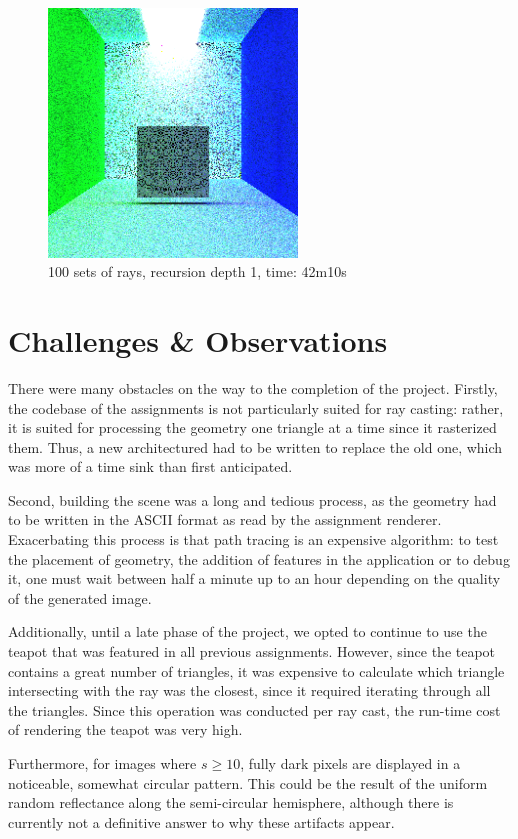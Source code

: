 \documentclass[12pt,journal]{IEEEtran}
\begin{document}
\begin{figure}[!t]

\centering
\includegraphics[width=2.6in]{100s_16d_42m10s}
\caption{100 sets of rays, recursion depth 1, time: 42m10s}
\label{1100s_16d_42m10s}

\end{figure}

\section{Challenges \& Observations}
There were many obstacles on the way to the completion of the project. Firstly, the codebase of the assignments is not particularly suited for ray casting: rather, it is suited for processing the geometry one triangle at a time since it rasterized them. Thus, a new architectured had to be written to replace the old one, which was more of a time sink than first anticipated. 
\par
Second, building the scene was a long and tedious process, as the geometry had to be written in the ASCII format as read by the assignment renderer. Exacerbating this process is that path tracing is an expensive algorithm: to test the placement of geometry, the addition of features in the application or to debug it, one must wait between half a minute up to an hour depending on the quality of the generated image.
\par
Additionally, until a late phase of the project, we opted to continue to use the teapot that was featured in all previous assignments. However, since the teapot contains a great number of triangles, it was  expensive to calculate which triangle intersecting with the ray was the closest, since it required iterating through all the triangles. Since this operation was conducted per ray cast, the run-time cost of rendering the teapot was very high.
\par
Furthermore, for images where $s \ge 10$, fully dark pixels are displayed in a noticeable, somewhat circular pattern. This could be the result of the uniform random reflectance along the semi-circular hemisphere, although there is currently not a definitive answer to why these artifacts appear.
\end{document}
